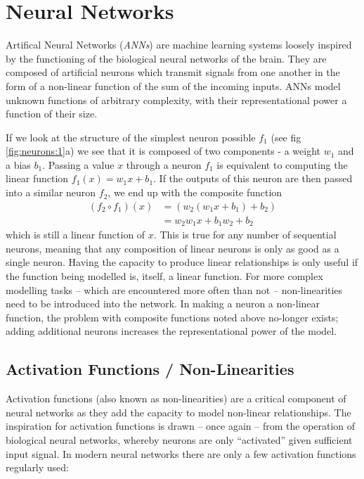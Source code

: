 \documentclass{report}
\begin{document}
	\section{Neural Networks}
	Artifical Neural Networks (\textit{ANNs}) are machine learning systems loosely inspired by the functioning of the biological neural networks of the brain. They are composed of artificial neurons which transmit signals from one another in the form of a non-linear function of the sum of the incoming inputs. ANNs model unknown functions of arbitrary complexity, with their representational power a function of their size. \par
	If we look at the structure of the simplest neuron possible $f_1$ (see fig \ref{fig:neurons:1}a) we see that it is composed of two components - a weight $w_1$ and a bias $b_1$. Passing a value $x$ through a neuron $f_1$ is equivalent to computing the linear function $f_1(x) = w_1x + b_1$.
	If the outputs of this neuron are then passed into a similar neuron $f_2$, we end up with the composite function 
	\begin{align}
	 (f_2\circ f_1)(x) &= (w_2(w_1x + b_1) + b_2) \\
	 &= w_2w_1x + b_1w_2 + b_2	
	\end{align}
	which is still a linear function of $x$. This is true for any number of sequential neurons, meaning that any composition of linear neurons is only as good as a single neuron. Having the capacity to produce linear relationships is only useful if the function being modelled is, itself, a linear function. For more complex modelling tasks -- which are encountered more often than not -- non-linearities need to be introduced into the network. In making a neuron a non-linear function, the problem with composite functions noted above no-longer exists; adding additional neurons increases the representational power of the model. \par
	
	\subsection{Activation Functions / Non-Linearities}
	Activation functions (also known as non-linearities) are a critical component of neural networks as they add the capacity to model non-linear relationships. The inspiration for activation functions is drawn -- once again -- from the operation of biological neural networks, whereby neurons are only ``activated'' given sufficient input signal. In modern neural networks there are only a few activation functions regularly used: \par
\end{document}
